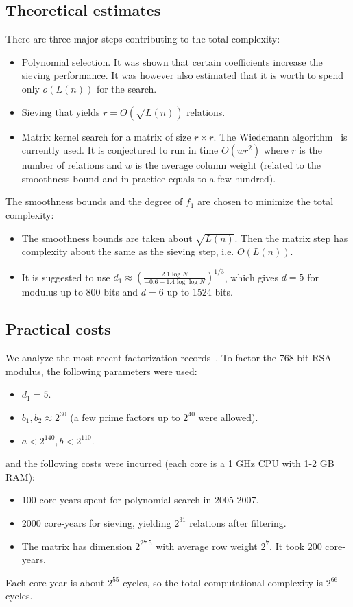 \documentclass[a4paper]{article}
\begin{document}
\subsection{Theoretical estimates}
There are three major steps contributing to the total complexity:
\begin{itemize}
    \item Polynomial selection. It was shown that certain coefficients increase the sieving performance. It was however also estimated that it is worth to spend only $o(L(n))$ for the search.
    \item Sieving that yields $r=O(\sqrt{L(n)})$ relations. 
    \item Matrix kernel search for a matrix of size $r\times r$. The Wiedemann algorithm~\cite{DBLP:journals/tit/Wiedemann86} is currently used. It is conjectured to run in time $O(wr^2)$ where $r$ is the number of relations and $w$ is the average column weight (related to the smoothness bound and in practice equals to a few hundred).
\end{itemize}
The smoothness bounds and the degree of $f_1$ are chosen to minimize the total complexity:
\begin{itemize}
    \item The smoothness bounds are taken about $\sqrt{L(n)}$. Then the matrix step has complexity about the same as the sieving step, i.e. $O(L(n))$.
    \item It is suggested to use 
$d_1 \approx \left(\frac{2.1\log N}{-0.6+1.4\log \log N }\right)^{1/3}$, which gives $d=5$ for modulus up to 800 bits and $d=6$ up to 1524 bits. 
\end{itemize}

\subsection{Practical costs} We analyze the most recent factorization records~\cite{DBLP:conf/crypto/KleinjungAFLTBGKMORTZ10,DBLP:journals/iacr/BaiTZ12,factor795}. To factor the 768-bit RSA modulus, the following parameters were used:
\begin{itemize}
    \item $d_1= 5$.
    \item $b_1,b_2 \approx 2^{30}$ (a few prime factors up to $2^{40}$ were allowed). 
    \item $a<2^{140}, b<2^{110}$.
\end{itemize}
and the following costs were incurred (each core is a 1 GHz CPU with 1-2 GB RAM):
\begin{itemize}
    \item 100 core-years spent for polynomial search in 2005-2007.
    \item 2000 core-years for sieving, yielding $2^{31}$ relations after filtering.
    \item The matrix has dimension $2^{27.5}$  with average row weight $2^7$. It took 200 core-years.
\end{itemize}
Each core-year is about $2^{55}$ cycles, so the total computational complexity is $2^{66}$ cycles. 
\end{document}
